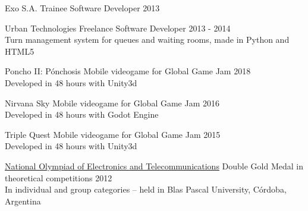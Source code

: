 \documentclass[10pt,a4paper]{article}
\begin{document}
\vspace{0.2em}
\headedsection
    { Exo S.A. }
    { \textsc{} }{
    \headedsubsection
        { Trainee Software Developer }
        { 2013 }
        {}
}

\vspace{0.2em}
\headedsection
    { Urban Technologies }
    { \textsc{} }{
    \headedsubsection
        { Freelance Software Developer }
        { 2013 - 2014}
        { \\ Turn management system for queues and waiting rooms, made in Python and HTML5 \href{http://www.eitsa.com.ar/producto.php?c=3&p=14}{\ExternalLink} }
}

\pagebreak

\spacedhrule{0.8em}{-0.4em} %


\vspace{0.2em}
\headedsection
    { Poncho II: Pónchosis \href{https://globalgamejam.org/2018/games/poncho-ii-p\%C3\%B3nchosis}{\ExternalLink} }
    { \textsc{} }{
    \headedsubsection
        { Mobile videogame for Global Game Jam }
        { 2018 }
        { \\ Developed in 48 hours with Unity3d }
}

\vspace{0.2em}
\headedsection
    { Nirvana Sky \href{http://globalgamejam.org/2016/games/nirvana-sky}{\ExternalLink} }
    { \textsc{} }{
    \headedsubsection
        { Mobile videogame for Global Game Jam }
        { 2016 }
        { \\ Developed in 48 hours with Godot Engine }
}

\vspace{0.2em}
\headedsection
    { Triple Quest \href{http://globalgamejam.org/2015/games/triple-quest}{\ExternalLink} }
    { \textsc{} }{
    \headedsubsection
        { Mobile videogame for Global Game Jam }
        { 2015 }
        { \\ Developed in 48 hours with Unity3d }
}

\vspace{0.2em}
\headedsection
    { \href{}{National Olympiad of Electronics and Telecommunications} }
    { \textsc{} }{
    \headedsubsection
        { Double Gold Medal in theoretical competitions }
        { 2012 }
        { \\ In individual and group categories -- held in Blas Pascal University, Córdoba, Argentina }
}
\end{document}
